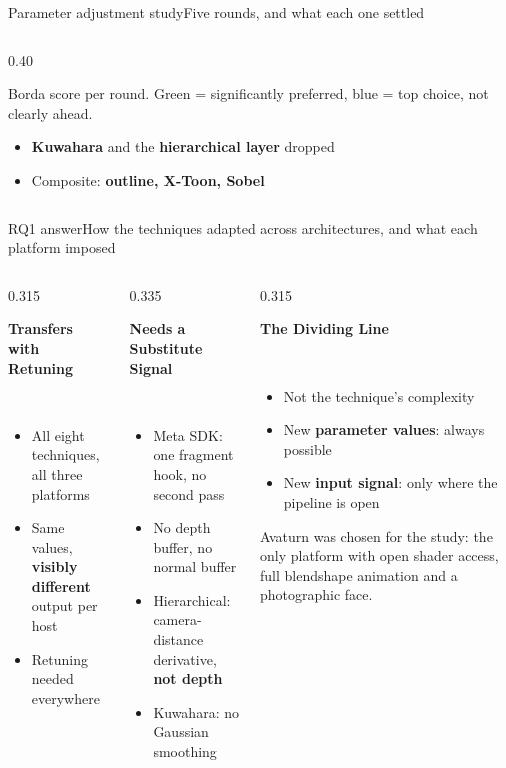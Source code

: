 \documentclass[aspectratio=169,10pt]{beamer}
\newcommand{\hl}[1]{{\color{knblue}\textbf{#1}}}
\newcommand{\bad}[1]{{\color{knred}\textbf{#1}}}
\newcommand{\panelhead}[1]{\noindent\colorbox{kncyan}{\parbox{0.96\textwidth}{\centering\vspace{1pt}\color{white}\scriptsize\bfseries #1\vspace{1pt}}}\\[0.25em]}
\newcommand{\panel}[1]{\noindent\colorbox{knlight}{\parbox{0.96\textwidth}{\vspace{2pt}\scriptsize
\begin{itemize}\setlength{\itemsep}{0.2em}\setlength{\leftmargini}{1.1em}#1\end{itemize}\vspace{2pt}}}}
\begin{document}
\begin{frame}{Parameter adjustment study}{Five rounds, and what each one settled}
\begin{columns}[T]
\begin{column}{0.40\textwidth}
      {\tiny\color{kngrey} Borda score per round. \textcolor{kngreen}{Green} = significantly preferred, \textcolor{knblue}{blue} = top choice, not clearly ahead.\par}
      \vspace{0.9em}

      \scriptsize
      \begin{itemize}\setlength{\itemsep}{0.25em}
        \item \bad{Kuwahara} and the \bad{hierarchical layer} dropped
        \item Composite: \hl{outline, X-Toon, Sobel}
      \end{itemize}
    \end{column}
  \end{columns}
\end{frame}


\begin{frame}{RQ1 answer}{How the techniques adapted across architectures, and what each platform imposed}
  \vspace{0.45em}
  \begin{columns}[T]
    \begin{column}{0.315\textwidth}
      \panelhead{Transfers with Retuning}
      \panel{%
        \item All eight techniques, all three platforms
        \item Same values, \hl{visibly different} output per host
        \item Retuning needed everywhere}
    \end{column}
    \begin{column}{0.335\textwidth}
      \panelhead{Needs a Substitute Signal}
      \panel{%
        \item Meta SDK: one fragment hook, no second pass
        \item No depth buffer, no normal buffer
        \item Hierarchical: camera-distance derivative, \hl{not depth}
        \item Kuwahara: no Gaussian smoothing}
    \end{column}
    \begin{column}{0.315\textwidth}
      \panelhead{The Dividing Line}
      \panel{%
        \item Not the technique's complexity
        \item New \hl{parameter values}: always possible
        \item New \hl{input signal}: only where the pipeline is open}
      \vspace{0.5em}
      {\tiny\color{kngrey}Avaturn was chosen for the study: the only platform with open shader access, full blendshape animation and a photographic face.\par}
    \end{column}
  \end{columns}
\end{frame}
\end{document}

